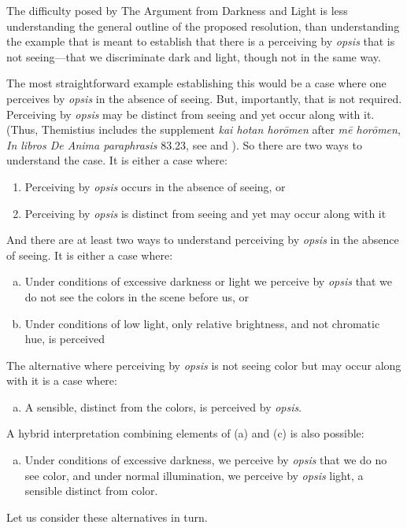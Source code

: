 The difficulty posed by The Argument from Darkness and Light is less understanding the general outline of the proposed resolution, than understanding the example that is meant to establish that there is a perceiving by \emph{opsis} that is not seeing—that we discriminate dark and light, though not in the same way.

The most straightforward example establishing this would be a case where one perceives by \emph{opsis} in the absence of seeing. But, importantly, that is not required. Perceiving by \emph{opsis} may be distinct from seeing and yet occur along with it. (Thus, Themistius includes the supplement \emph{kai hotan horōmen} after \emph{mē horōmen}, \emph{In libros De Anima paraphrasis} 83.23, see \citealt[105, 181 n3]{Todd:1996aa} and \citealt[238]{Browne:1986aa}). So there are two ways to understand the case. It is either a case where:
\begin{enumerate}[(1)]
	\item Perceiving by \emph{opsis} occurs in the absence of seeing, or
	\item Perceiving by \emph{opsis} is distinct from seeing and yet may occur along with it
\end{enumerate}
And there are at least two ways to understand perceiving by \emph{opsis} in the absence of seeing. It is either a case where:
\begin{enumerate}[(a)]
	\item Under conditions of excessive darkness or light we perceive by \emph{opsis} that we do not see the colors in the scene before us, or
	\item Under conditions of low light, only relative brightness, and not chromatic hue, is perceived
\end{enumerate}
The alternative where perceiving by \emph{opsis} is not seeing color but may occur along with it is a case where:
\begin{enumerate}[(c)]
	\item A sensible, distinct from the colors, is perceived by \emph{opsis}.
\end{enumerate}
A hybrid interpretation combining elements of (a) and (c) is also possible:
\begin{enumerate}[(d)]
	\item Under conditions of excessive darkness, we perceive by \emph{opsis} that we do no see color, and under normal illumination, we perceive by \emph{opsis} light, a sensible distinct from color.
\end{enumerate}
Let us consider these alternatives in turn.



